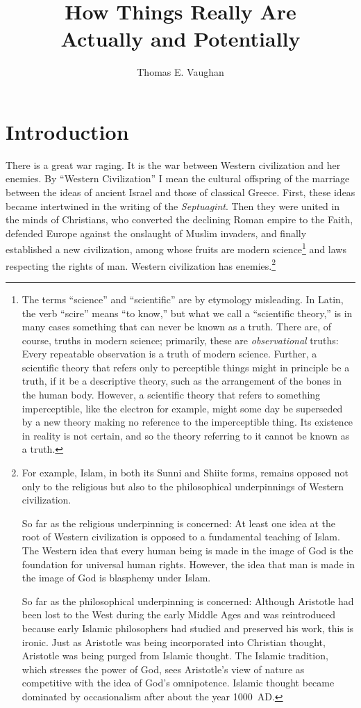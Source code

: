 \documentclass[twocolumn]{article}
\title{How Things Really Are\\{\Large Actually and Potentially}}
\author{Thomas E. Vaughan}
\begin{document}
\maketitle

\section{Introduction}

There is a great war raging.  It is the war between Western civilization and
her enemies.  By ``Western Civilization'' I mean the cultural offspring of the
marriage between the ideas of ancient Israel and those of classical Greece.
First, these ideas became intertwined in the writing of the {\it Septuagint}.
Then they were united in the minds of Christians, who converted the declining
Roman empire to the Faith, defended Europe against the onslaught of Muslim
invaders, and finally established a new civilization, among whose fruits are
modern science\footnote{%
   The terms ``science'' and ``scientific'' are by etymology misleading.  In
   Latin, the verb ``scire'' means ``to know,'' but what we call a ``scientific
   theory,'' is in many cases something that can never be known as a truth.
   There are, of course, truths in modern science; primarily, these are
   \emph{observational} truths: Every repeatable observation is a truth of
   modern science.  Further, a scientific theory that refers only to
   perceptible things might in principle be a truth, if it be a descriptive
   theory, such as the arrangement of the bones in the human body.  However, a
   scientific theory that refers to something imperceptible, like the electron
   for example, might some day be superseded by a new theory making no
   reference to the imperceptible thing.  Its existence in reality is not
   certain, and so the theory referring to it cannot be known as a truth.%
}
and laws respecting the rights of man.  Western civilization has
enemies.\footnote{%
   For example, Islam, in both its Sunni and Shiite forms, remains opposed not
   only to the religious but also to the philosophical underpinnings of Western
   civilization.

   So far as the religious underpinning is concerned: At least one idea at the
   root of Western civilization is opposed to a fundamental teaching of Islam.
   The Western idea that every human being is made in the image of God is the
   foundation for universal human rights.  However, the idea that man is made
   in the image of God is blasphemy under Islam.
   
   So far as the philosophical underpinning is concerned: Although Aristotle
   had been lost to the West during the early Middle Ages and was reintroduced
   because early Islamic philosophers had studied and preserved his work, this
   is ironic.  Just as Aristotle was being incorporated into Christian thought,
   Aristotle was being purged from Islamic thought.  The Islamic tradition,
   which stresses the power of God, sees Aristotle's view of nature as
   competitive with the idea of God's omnipotence.  Islamic thought became
   dominated by occasionalism after about the year 1000~AD.
}
\end{document}
